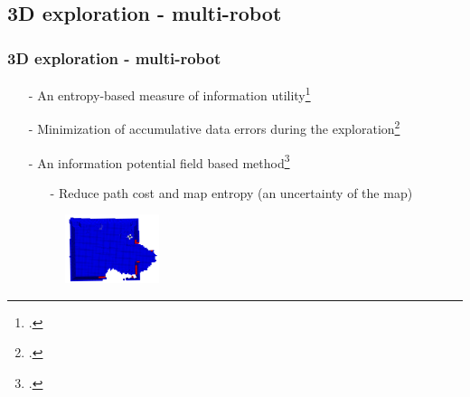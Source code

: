 \subsection{3D exploration - multi-robot}
\begin{frame}
	\frametitle{3D exploration - multi-robot}
	\begin{itemize}
		\item[-] An entropy-based measure of information utility\footcite{Rocha2005}
		\item[-] Minimization of accumulative data errors during the exploration\footcite{Vutetakis2019}
		\item[-] An information potential field based method\footcite{Wang2019} 
		\begin{itemize}
			\item[-] Reduce path cost and map entropy (an uncertainty of the map)
		\end{itemize} 
		\begin{figure}
			\centering
			\includegraphics[height=2cm]{figures/frontier_extraction}
		\end{figure}


				
	\end{itemize}	
\end{frame}

